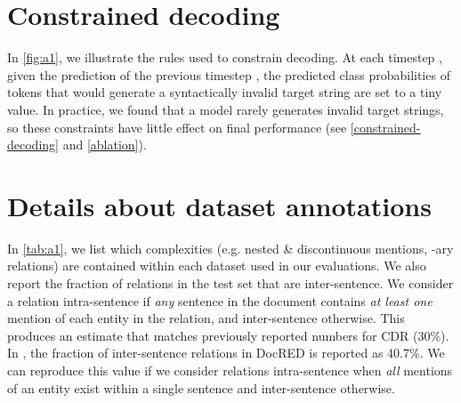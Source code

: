 \documentclass[11pt]{article}
\begin{document}
\section{Constrained decoding}
\label{appendix:constrained-decoding}

In \autoref{fig:a1}, we illustrate the rules used to constrain decoding. At each timestep , given the prediction of the previous timestep , the predicted class probabilities of tokens that would generate a syntactically invalid target string are set to a tiny value. In practice, we found that a model rarely generates invalid target strings, so these constraints have little effect on final performance (see \textsection\ref{constrained-decoding} and \textsection\ref{ablation}).

\section{Details about dataset annotations}
\label{appendix:dataset-details}

In \autoref{tab:a1}, we list which complexities (e.g. nested \& discontinuous mentions, -ary relations) are contained within each dataset used in our evaluations. We also report the fraction of relations in the test set that are inter-sentence. We consider a relation intra-sentence if \textit{any} sentence in the document contains \textit{at least one} mention of each entity in the relation, and inter-sentence otherwise. This produces an estimate that matches previously reported numbers for CDR (30\%). In \citet{Yao2019DocREDAL}, the fraction of inter-sentence relations in DocRED is reported as 40.7\%. We can reproduce this value if we consider relations intra-sentence when \textit{all} mentions of an entity exist within a single sentence and inter-sentence otherwise.
 
\end{document}
